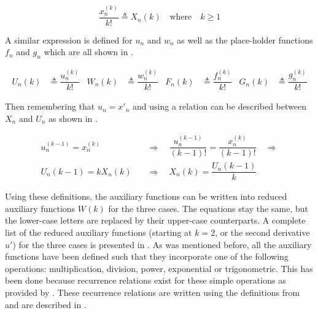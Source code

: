 \begin{equation} \label{eq:tsCoeff}
\dfrac{x_{n}^{\left(k\right)}}{k!} \triangleq X_{n}\left(k\right) \quad \text{where} \quad k \geq 1
\end{equation}

A similar expression is defined for $u_{n}$ and $w_{n}$ as well as the place-holder functions $f_{n}$ and $g_{n}$ which are all shown in .

\begin{align} \label{eq:redDer}
U_{n}\left(k\right)& \triangleq \dfrac{u_{n}^{\left(k\right)}}{k!}
&
W_{n}\left(k\right)& \triangleq \dfrac{w_{n}^{\left(k\right)}}{k!}
&
F_{n}\left(k\right)& \triangleq \dfrac{f_{n}^{\left(k\right)}}{k!}
&
G_{n}\left(k\right)& \triangleq \dfrac{g_{n}^{\left(k\right)}}{k!}
\end{align}



Then remembering that $u_{n}=x'_{n}$ and using  a relation can be described between $X_{n}$ and $U_{n}$ as shown in  \citep{scott2008high}. 

\begin{equation} \label{eq:UnXn}
\begin{split}
u_{n}^{\left( k-1\right)}=x_{n}^{\left( k\right)} \quad &\Rightarrow \quad \dfrac{u_{n}^{\left( k-1\right)}}{\left(k-1\right)!} = \dfrac{x_{n}^{\left( k\right)}}{\left(k-1\right)!} \quad \Rightarrow\\
U_{n}\left(k-1\right)=kX_{n}\left(k\right) \quad &\Rightarrow \quad X_{n}\left(k\right)=\dfrac{U_{n}\left(k-1\right)}{k}
\end{split}
\end{equation}

Using these definitions, the auxiliary functions can be written into reduced auxiliary functions $W\left(k\right)$ for the three cases. The equations stay the same, but the lower-case letters are replaced by their upper-case counterparts. A complete list of the reduced auxiliary functions (starting at $k=2$, or the second derivative $u'$) for the three cases is presented in .
As was mentioned before, all the auxiliary functions have been defined such that they incorporate one of the following operations: multiplication, division, power, exponential or trigonometric. This has been done because recurrence relations exist for these simple operations as provided by \cite{jorba2005software}. These recurrence relations are written using the definitions from  and are described in .

